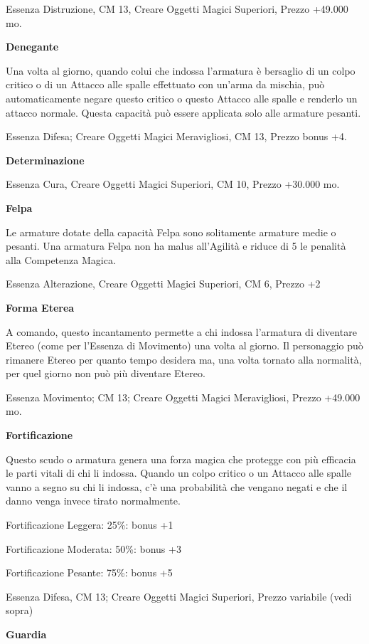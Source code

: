 \documentclass[a4paper,11pt,twoside,openany]{book}
\begin{document}
{Essenza Distruzione, CM 13, Creare Oggetti Magici Superiori, Prezzo +49.000 mo.

\textbf{Denegante}

Una volta al giorno, quando colui che indossa l'armatura è bersaglio di un colpo critico o di un Attacco alle spalle effettuato con un'arma da mischia, può automaticamente negare questo critico o questo Attacco alle spalle e renderlo un attacco normale. Questa capacità può essere applicata solo alle armature pesanti.

Essenza Difesa; Creare Oggetti Magici Meravigliosi, CM 13, Prezzo bonus +4.

\textbf{Determinazione}

Essenza Cura, Creare Oggetti Magici Superiori, CM 10, Prezzo +30.000
mo.

\textbf{Felpa}

Le armature dotate della capacità Felpa sono solitamente armature medie o pesanti. Una armatura Felpa non ha malus all'Agilità e riduce di 5 le penalità alla Competenza Magica.

Essenza Alterazione, Creare Oggetti Magici Superiori, CM 6, Prezzo
+2

\textbf{Forma Eterea}

A comando, questo incantamento permette a chi indossa l'armatura di diventare Etereo (come per l'Essenza di Movimento) una volta al giorno. Il personaggio può rimanere Etereo per quanto tempo desidera ma, una volta tornato alla normalità, per quel giorno non può più diventare Etereo.

Essenza Movimento; CM 13; Creare Oggetti Magici Meravigliosi, Prezzo +49.000 mo.

\textbf{Fortificazione}

Questo scudo o armatura genera una forza magica che protegge con più efficacia le parti vitali di chi li indossa. Quando un colpo critico o un Attacco alle spalle vanno a segno su chi li indossa, c'è una probabilità che vengano negati e che il danno venga invece tirato normalmente.

Fortificazione Leggera: 25\%: bonus +1

Fortificazione Moderata: 50\%: bonus +3

Fortificazione Pesante: 75\%: bonus +5

Essenza Difesa, CM 13; Creare Oggetti Magici Superiori, Prezzo variabile (vedi sopra)

\textbf{Guardia}

}
\end{document}
